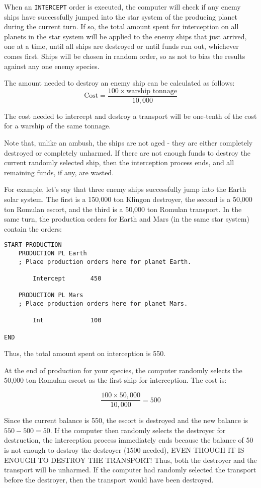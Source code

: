 \documentclass[10pt,titlepage]{article}
\begin{document}
When an \texttt{INTERCEPT} order is executed, the computer will check if any enemy
ships have successfully jumped into the star system of the producing planet
during the current turn.  If so, the total amount spent for interception on
all planets in the star system will be applied to the enemy ships that just
arrived, one at a time, until all ships are destroyed or until funds run out,
whichever comes first.  Ships will be chosen in random order, so as not to
bias the results against any one enemy species.

The amount needed to destroy an enemy ship can be calculated as follows:
\[
   \textrm{Cost} =  \dfrac{100  \times  \textrm{warship tonnage}}{10,000}
\]

The cost needed to intercept and destroy a transport will be one-tenth of the
cost for a warship of the same tonnage.

Note that, unlike an ambush, the ships are not aged - they are either
completely destroyed or completely unharmed.  If there are not enough funds
to destroy the current randomly selected ship, then the interception process
ends, and all remaining funds, if any, are wasted.

For example, let's say that three enemy ships successfully jump into the Earth
solar system.  The first is a 150,000 ton Klingon destroyer, the second is a
50,000 ton Romulan escort, and the third is a 50,000 ton Romulan transport.
In the same turn, the production orders for Earth and Mars (in the same star
system) contain the orders:

\begin{verbatim}
START PRODUCTION
    PRODUCTION PL Earth
    ; Place production orders here for planet Earth.

        Intercept       450

    PRODUCTION PL Mars
    ; Place production orders here for planet Mars.

        Int             100

END\end{verbatim}

Thus, the total amount spent on interception is 550.

At the end of production for your species, the computer randomly selects the
50,000 ton Romulan escort as the first ship for interception.  The cost is:

\[
			\dfrac{100  \times  50,000}{10,000}  =  500
\]

Since the current balance is 550, the escort is destroyed and the new balance
is $550 - 500 = 50$.  If the computer then randomly selects the destroyer for
destruction, the interception process immediately ends because the balance of
50 is not enough to destroy the destroyer (1500 needed), EVEN THOUGH IT IS
ENOUGH TO DESTROY THE TRANSPORT!  Thus, both the destroyer and the transport
will be unharmed.  If the computer had randomly selected the transport before
the destroyer, then the transport would have been destroyed.
\end{document}
